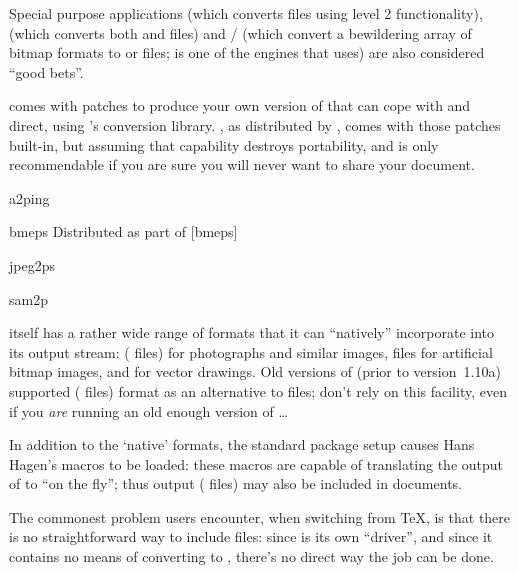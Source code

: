 Special purpose applications  (which converts
 files using \PS{} level 2 functionality),
 (which converts both  and 
files) and / (which convert a
bewildering array of bitmap formats to  or  files;
 is one of the engines that  uses)
are also considered ``good bets''.

 comes with patches to produce your own version of
 that can cope with  and  direct,
using 's conversion library.  , as
distributed by \miktex{}, comes with those patches built-in, but
assuming that capability destroys portability, and is only
recommendable if you are sure you will never want to share your
document.
\begin{ctanrefs}
\item[a2ping]
\item[bmeps]Distributed as part of [bmeps]
\item[jpeg2ps]
\item[sam2p]
\end{ctanrefs}


\PDFTeX{} itself has a rather wide range of formats that it can
``natively'' incorporate into its output  stream:
 ( files) for photographs and similar images,
 files for artificial bitmap images, and  for
vector drawings.  Old versions of \PDFTeX{} (prior to version~1.10a)
supported  ( files) format as an alternative
to  files; don't rely on this facility, even if you
\emph{are} running an old enough version of \PDFTeX{}\dots{}

In addition to the `native' formats, the standard \PDFLaTeX{}
 package setup causes Hans Hagen's 
macros to be loaded: these macros are capable of translating the
output of \MP{} to  ``on the fly''; thus \MP{} output
( files) may also be included in \PDFLaTeX{} documents.

The commonest problem users encounter, when switching from \TeX{}, is
that there is no straightforward way to include  files:
since \PDFTeX{} is its own ``driver'', and since it contains no means
of converting \PS{} to , there's no direct way the job can
be done.

